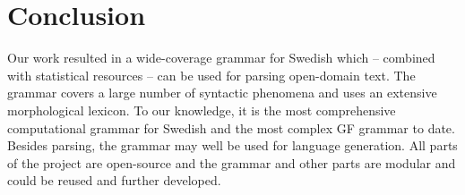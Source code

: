 \documentclass[runningheads,a4paper]{llncs}
\begin{document}

%





\section{Conclusion}
Our work resulted in a wide-coverage grammar for Swedish which --
combined with statistical resources -- can be used for parsing 
open-domain text. The grammar covers a large number of syntactic 
phenomena and uses an extensive morphological lexicon. To
our knowledge, it is the most comprehensive computational grammar for
Swedish and the most complex GF grammar to date.
Besides parsing, the grammar may well be used for language generation.
All parts of the project are open-source and the grammar and other parts
are modular and could be reused and further developed.



\end{document}
